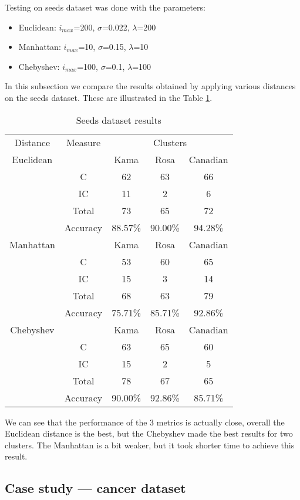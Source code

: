 \documentclass[conference]{IEEEtran}
\begin{document}
Testing on seeds dataset was done with the parameters:
\begin{itemize}
\item Euclidean: $i_{max}$=200, $\sigma$=0.022, $\lambda$=200
\item Manhattan: $i_{max}$=10, $\sigma$=0.15, $\lambda$=10
\item Chebyshev: $i_{max}$=100, $\sigma$=0.1, $\lambda$=100
\end{itemize}

In this subsection we compare the results obtained by applying various distances on the seeds \cite{website:seeds} dataset. These are illustrated in the Table \ref{table_seeds}.

\begin{table}[!t]
\renewcommand{\arraystretch}{1.3}
\caption{Seeds dataset results}
\label{table_seeds}
\centering
\begin{tabular}{|c|c|c|c|c|}
\cline{1-5}
 Distance & Measure & \multicolumn{3}{|c|}{Clusters} \\
\cline{1-5}
Euclidean & & Kama & Rosa & Canadian	  \\
& C & 62 & 63 & 66 \\
& IC & 11 & 2 & 6 \\
& Total & 73 & 65 & 72 \\
& Accuracy & 88.57\% & 90.00\% & 94.28\% \\
\hline
Manhattan & & Kama & Rosa & Canadian	  \\
& C & 53 & 60 & 65 \\
& IC & 15 & 3 & 14 \\
& Total & 68 & 63 & 79 \\
& Accuracy & 75.71\% & 85.71\% & 92.86\% \\
\hline
Chebyshev & & Kama & Rosa & Canadian	  \\
& C & 63 & 65 & 60 \\
& IC & 15 & 2 & 5 \\
& Total & 78 & 67 & 65 \\
& Accuracy & 90.00\% & 92.86\% & 85.71\% \\
\hline
\end{tabular}
\end{table}

We can see that the performance of the 3 metrics is actually close, overall the Euclidean distance is the best, but the Chebyshev made the best results for two clusters. The Manhattan is a bit weaker, but it took shorter time to achieve this result.

\subsection{Case study --- cancer dataset}
\end{document}
